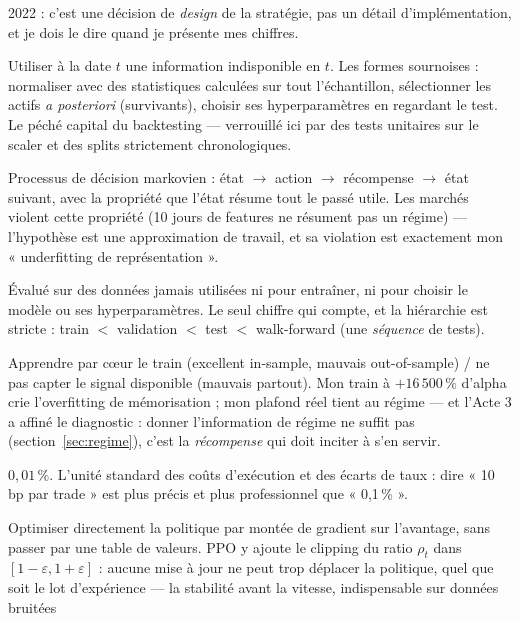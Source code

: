 \documentclass[11pt,a4paper]{article}
\begin{document}
\begin{description}[itemsep=4pt, font=\normalfont\bfseries]
        2022 : c'est une décision de \emph{design} de la stratégie, pas un détail
        d'implémentation, et je dois le dire quand je présente mes chiffres.
  \item[Look-ahead bias] Utiliser à la date $t$ une information indisponible en $t$.
        Les formes sournoises : normaliser avec des statistiques calculées sur tout
        l'échantillon, sélectionner les actifs \emph{a posteriori} (survivants),
        choisir ses hyperparamètres en regardant le test. Le péché capital du
        backtesting --- verrouillé ici par des tests unitaires sur le scaler et des
        splits strictement chronologiques.
  \item[MDP] Processus de décision markovien : état $\to$ action $\to$ récompense
        $\to$ état suivant, avec la propriété que l'état résume tout le passé utile.
        Les marchés violent cette propriété (10 jours de features ne résument pas un
        régime) --- l'hypothèse est une approximation de travail, et sa violation est
        exactement mon « underfitting de représentation ».
  \item[Out-of-sample] Évalué sur des données jamais utilisées ni pour entraîner, ni
        pour choisir le modèle ou ses hyperparamètres. Le seul chiffre qui compte, et
        la hiérarchie est stricte : train $<$ validation $<$ test $<$ walk-forward
        (une \emph{séquence} de tests).
  \item[Overfitting / underfitting] Apprendre par c\oe ur le train (excellent
        in-sample, mauvais out-of-sample) / ne pas capter le signal disponible
        (mauvais partout). Mon train à $+16\,500\,\%$ d'alpha crie l'overfitting de
        mémorisation ; mon plafond réel tient au régime --- et l'Acte 3 a affiné le
        diagnostic : donner l'information de régime ne suffit pas
        (section~\ref{sec:regime}), c'est la \emph{récompense} qui doit inciter à
        s'en servir.
  \item[Point de base (bp)] $0{,}01\,\%$. L'unité standard des coûts d'exécution et
        des écarts de taux : dire « 10\,bp par trade » est plus précis et plus
        professionnel que « 0,1\,\% ».
  \item[Policy gradient / PPO] Optimiser directement la politique par montée de
        gradient sur l'avantage, sans passer par une table de valeurs. PPO y ajoute le
        clipping du ratio $\rho_t$ dans $[1-\varepsilon, 1+\varepsilon]$ : aucune mise
        à jour ne peut trop déplacer la politique, quel que soit le lot d'expérience
        --- la stabilité avant la vitesse, indispensable sur données bruitées

\end{description}
\end{document}
